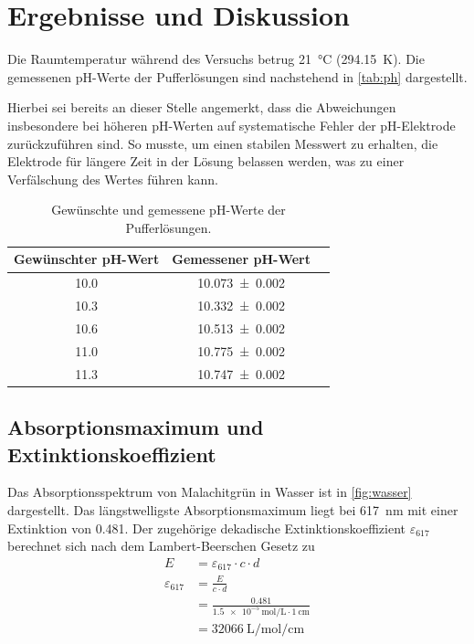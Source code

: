 \section{Ergebnisse und Diskussion}
Die Raumtemperatur während des Versuchs betrug \qty{21}{\degreeCelsius} (\qty{294.15}{\kelvin}).
Die gemessenen pH-Werte der Pufferlösungen sind nachstehend in \autoref{tab:ph} dargestellt.

Hierbei sei bereits an dieser Stelle angemerkt, dass die Abweichungen insbesondere bei höheren pH-Werten auf systematische Fehler der pH-Elektrode zurückzuführen sind.
So musste, um einen stabilen Messwert zu erhalten, die Elektrode für längere Zeit in der Lösung belassen werden, was zu einer Verfälschung des Wertes führen kann.
\begin{table}[H]
    \centering
    \caption{Gewünschte und gemessene pH-Werte der Pufferlösungen.}
    \label{tab:ph}
    \begin{tabular}{c c c}
        \toprule
        Gewünschter pH-Wert & Gemessener pH-Wert \\
        \midrule
        \num{10.0} & \num{10.073 +- 0.002} \\ \midrule
        \num{10.3} & \num{10.332 +- 0.002} \\ \midrule
        \num{10.6} & \num{10.513 +- 0.002} \\ \midrule
        \num{11.0} & \num{10.775 +- 0.002} \\ \midrule
        \num{11.3} & \num{10.747 +- 0.002} \\
        \bottomrule
    \end{tabular}
\end{table}

\subsection{Absorptionsmaximum und Extinktionskoeffizient}
Das Absorptionsspektrum von Malachitgrün in Wasser ist in \autoref{fig:wasser} dargestellt.
Das längstwelligste Absorptionsmaximum liegt bei \qty{617}{\nano\meter} mit einer Extinktion von \num{0.481}.
Der zugehörige dekadische Extinktionskoeffizient $\varepsilon_{617}$ berechnet sich nach dem Lambert-Beerschen Gesetz zu
\begin{align*}
    E &= \varepsilon_{617} \cdot c \cdot d \\
    \varepsilon_{617} &= \frac{E}{c \cdot d} \\
    &= \frac{0.481}{\qty{1.5e-5}{\mol\per\liter} \cdot \qty{1}{\centi\meter}} \\
    &= \qty{32066}{\liter\per\mol\per\centi\meter}
\end{align*}

